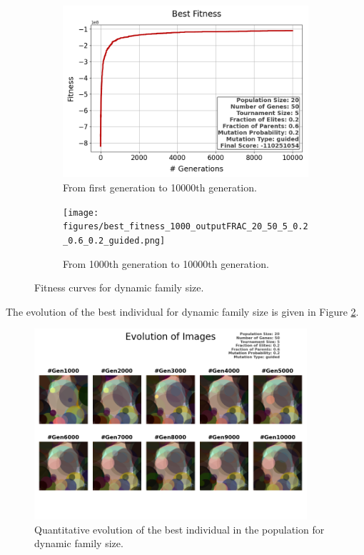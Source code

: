\documentclass{assignment}
\begin{document}
\begin{figure}[H]
    \begin{subfigure}{0.5\textwidth}
        \includegraphics[width=\textwidth]{figures/best_fitness_outputFRAC_20_50_5_0.2_0.6_0.2_guided.png}
        \caption{From first generation to 10000th generation.}
    \end{subfigure}\hfill
    \begin{subfigure}{0.5\textwidth}
        \texttt{[image: figures/best\_fitness\_1000\_outputFRAC\_20\_50\_5\_0.2\_0.6\_0.2\_guided.png]}
        \caption{From 1000th generation to 10000th generation.}
    \end{subfigure}
    \caption{Fitness curves for dynamic family size.}
\label{fig:dynamic_family}
\end{figure}

The evolution of the best individual for dynamic family size is given in Figure \ref{fig:dynamic_family_image}.
\begin{figure}[!htb]
    \centering
    \includegraphics[width=0.9\textwidth]{figures/images_outputFRAC_20_50_5_0.2_0.6_0.2_guided.png}
    \caption{Quantitative evolution of the best individual in the population for dynamic family size.}
    \label{fig:dynamic_family_image}
\end{figure}
\end{document}
